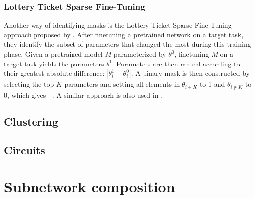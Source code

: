 \documentclass[11pt]{article}
\DeclareMathOperator*{\subnetwork}{\hat{\theta}}
\begin{document}
\subsubsection{Lottery Ticket Sparse Fine-Tuning}
Another way of identifying masks is the Lottery Ticket Sparse Fine-Tuning approach proposed by \citet{ansell-etal-2022-composable}. After finetuning a pretrained network on a target task, they identify the subset of parameters that changed the most during this training phase. Given a pretrained model $M$ parameterized by $\theta^0$, finetuning $M$ on a target task yields the parameters $\theta^1$. Parameters are then ranked according to their greatest absolute difference: $|\theta^1_i - \theta^0_i|$. A binary mask is then constructed by selecting the top $K$ parameters and setting all elements in $\theta_{i \in K}$ to 1 and $\theta_{i \notin K}$ to 0, which gives $\subnetwork$. A similar approach is also used in \citet{frankle2018the}.

\subsection{Clustering}
\citet{watanabe2019interpreting, casper2022graphical}
\subsection{Circuits}
\citep{conmy2023towards, nanda2023progress, wang2023interpretability}
\section{Subnetwork composition}
\newpage

\end{document}
